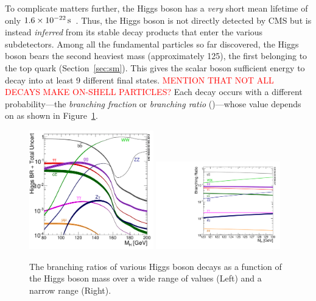 To complicate matters further, the Higgs boson has a \emph{very} short mean lifetime of only $1.6 \times \text{10}^\text{$-$22}\,\text{s}$~\cite{pdg}.
Thus, the Higgs boson is not directly detected by CMS but is instead \emph{inferred} from its stable decay products that enter the various subdetectors.
Among all the fundamental particles so far discovered, the Higgs boson bears the second heaviest mass (approximately 125\GeV), the first belonging to the top quark (Section~\ref{sec:sm}).
This gives the scalar boson sufficient energy to decay into at least 9 different final states.
\textcolor{red}{MENTION THAT NOT ALL DECAYS MAKE ON-SHELL PARTICLES?}
Each decay occurs with a different probability---the \emph{branching fraction} or \emph{branching ratio} (\br)---whose value depends on \mH as shown in Figure~\ref{fig:higgs_br}.
\begin{figure}[!htbp]
    \begin{center}
		\includegraphics[width=0.48\textwidth]{figures/higgsmassmeas/higgs_BR_80to200GeV.pdf}
		\includegraphics[width=0.48\textwidth]{figures/higgsmassmeas/higgs_BR_120to130GeV.pdf}
		\caption{
            The branching ratios of various Higgs boson decays as a function of the Higgs boson mass
            over a wide range of values (Left) and a narrow range (Right).
            }
		\label{fig:higgs_br}
	\end{center}
\end{figure} 
